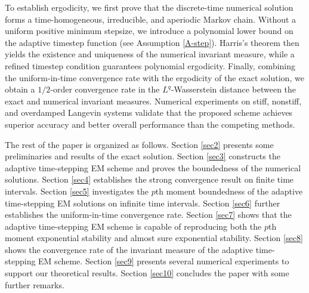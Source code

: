 \documentclass[preprint,12pt,compress]{elsarticle}
\begin{document}
To establish ergodicity, we first prove that the discrete-time numerical solution forms a time-homogeneous, irreducible, and aperiodic Markov chain. Without a uniform positive minimum stepsize, we introduce a polynomial lower bound on the adaptive timestep function (see Assumption \ref{A-step}). Harris's theorem then yields the existence and uniqueness of the numerical invariant measure, while a refined timestep condition guarantees polynomial ergodicity. Finally, combining the uniform-in-time convergence rate with the ergodicity of the exact solution, we obtain a $1/2$-order convergence rate in the $L^q$-Wasserstein distance between the exact and numerical invariant measures. Numerical experiments on stiff, nonstiff, and overdamped Langevin systems validate that the proposed scheme achieves superior accuracy and better overall performance than the competing methods.



The rest of the paper is organized as follows. Section \ref{sec2} presents some preliminaries and results of the exact solution. Section \ref{sec3} constructs the adaptive time-stepping EM scheme and proves the boundedness of the numerical solutions. 
Section \ref{sec4} establishes the strong convergence result on finite time intervals. 
Section \ref{sec5} investigates the $p$th moment boundedness of the adaptive time-stepping EM solutions on infinite time intervals. Section \ref{sec6} further establishes the uniform-in-time convergence rate. 
Section \ref{sec7} shows that the adaptive time-stepping EM scheme is capable of reproducing both the $p$th moment exponential stability and almost sure exponential stability. 
Section \ref{sec8} shows the convergence rate of the invariant measure of the adaptive time-stepping EM scheme.
Section \ref{sec9} presents several numerical experiments to support our theoretical results. 
Section \ref{sec10} concludes the paper with some further remarks.

\end{document}
